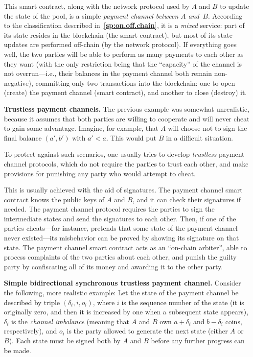 \documentclass[12pt,oneside]{article}
\def\makepoint#1{\medbreak\noindent{\bf #1.\ }}
\def\nxsubpoint{\refstepcounter{subsubsection}%
  \smallbreak\makepoint{\thesubsubsection}}
\def\refpoint#1{{\rm\textbf{\ref{#1}}}}
\let\ptref=\refpoint
\def\embt(#1.){\textbf{#1.}}
\begin{document}
This smart contract, along with the network protocol used by $A$ and
$B$ to update the state of the pool, is a simple {\em payment channel
  between $A$ and~$B$.} According to the classification described
in~\ptref{sp:on.off.chain}, it is a {\em mixed\/} service: part of its
state resides in the blockchain (the smart contract), but most of its
state updates are performed off-chain (by the network protocol). If
everything goes well, the two parties will be able to perform as many
payments to each other as they want (with the only restriction being
that the ``capacity'' of the channel is not overrun---i.e., their
balances in the payment channel both remain non-negative), committing
only two transactions into the blockchain: one to open (create) the
payment channel (smart contract), and another to close (destroy) it.

\nxsubpoint \embt(Trustless payment channels.)  The previous example
was somewhat unrealistic, because it assumes that both parties are
willing to cooperate and will never cheat to gain some
advantage. Imagine, for example, that $A$ will choose not to sign the
final balance $(a',b')$ with $a'<a$. This would put $B$ in a difficult
situation.

To protect against such scenarios, one usually tries to develop {\em
  trustless\/} payment channel protocols, which do not require the
parties to trust each other, and make provisions for punishing any
party who would attempt to cheat.

This is usually achieved with the aid of signatures. The payment
channel smart contract knows the public keys of $A$ and $B$, and it
can check their signatures if needed. The payment channel protocol
requires the parties to sign the intermediate states and send the
signatures to each other. Then, if one of the parties cheats---for
instance, pretends that some state of the payment channel never
existed---its misbehavior can be proved by showing its signature on
that state. The payment channel smart contract acts as an ``on-chain
arbiter'', able to process complaints of the two parties about each
other, and punish the guilty party by confiscating all of its money
and awarding it to the other party.

\nxsubpoint\label{sp:simple.sync.pc} \embt(Simple bidirectional
synchronous trustless payment channel.)  Consider the following, more
realistic example: Let the state of the payment channel be described
by triple $(\delta_i,i,o_i)$, where $i$ is the sequence number of the
state (it is originally zero, and then it is increased by one when a
subsequent state appears), $\delta_i$ is the {\em channel imbalance\/}
(meaning that $A$ and $B$ own $a+\delta_i$ and $b-\delta_i$ coins,
respectively), and $o_i$ is the party allowed to generate the next
state (either $A$ or $B$). Each state must be signed both by $A$ and
$B$ before any further progress can be made.
\end{document}
